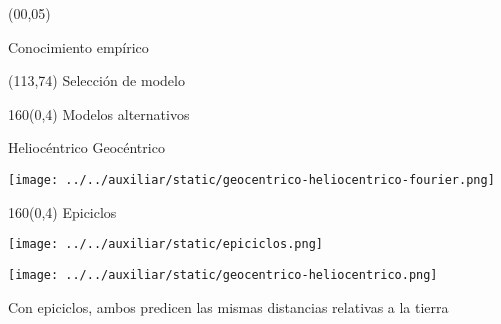 \documentclass[shownotes,aspectratio=169]{beamer}
\begin{document}
\color{black!85}
\large

\begin{frame}
 
 \begin{textblock}{90}(00,05)
\begin{center}
 \huge  \textcolor{black!66}{Conocimiento empírico}
\end{center}
\end{textblock}

 \begin{textblock}{47}(113,74)
\centering \Large  \textcolor{white!55}{Selección de modelo}
\end{textblock}

{}
\end{frame}


\begin{frame}[plain]
\begin{textblock}{160}(0,4)
 \centering \Large Modelos alternativos \\
\end{textblock}
\vspace{1cm}

\centering

Heliocéntrico \hspace{1.2cm} Geocéntrico

\texttt{[image: ../../auxiliar/static/geocentrico-heliocentrico-fourier.png]}

\end{frame}

\begin{frame}[plain]
\begin{textblock}{160}(0,4)
 \centering \Large Epiciclos \\
\end{textblock}
\vspace{0.75cm}

\centering

\texttt{[image: ../../auxiliar/static/epiciclos.png]}

\end{frame}


\begin{frame}[plain]
 
\centering
\texttt{[image: ../../auxiliar/static/geocentrico-heliocentrico.png]}

\vspace{0.5cm}
Con epiciclos, ambos predicen las mismas distancias relativas a la tierra

\end{frame}
\end{document}
